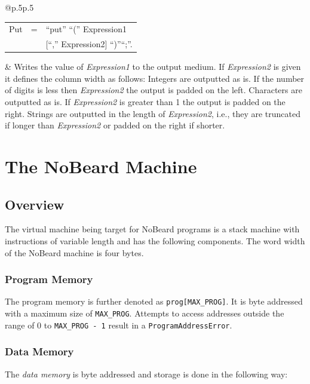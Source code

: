 \documentclass[11pt]{report}
\newcommand{\leongage}{NoBeard}
\newenvironment{grammar}[2]
	{
		\newcommand{\completerule}[2]{##1 & = & ##2.\\}
		\newcommand{\startrule}[2]{##1 & = & ##2\\}
		\newcommand{\alternativerule}[1]{ & $|$ & ##1\\}
		\newcommand{\alternativeend}[1]{ & $|$ & ##1.\\}
		\newcommand{\finishrule}[1]{ & & ##1.\\}
		\begin{tabular}{p{#1} c p{#2}}
	}
	{	\end{tabular}
	}
\begin{document}
\noindent \begin{tabular}{@{}p{}p{}}

\begin{grammar}{}{}
	\startrule{Put}{``put'' ``('' Expression1}
	\finishrule {[``,'' Expression2] ``)''``;''}
\end{grammar}
&
Writes the value of {\em Expression1} to the output medium. If {\em Expression2} is given it defines the column width as follows: Integers are outputted as is. If the number of digits is less then {\em Expression2} the output is padded on the left. Characters are outputted as is. If {\em Expression2} is greater than 1 the output is padded on the right. Strings are outputted in the length of {\em Expression2}, i.e., they are truncated if longer than {\em Expression2} or padded on the right if shorter.
\end{tabular}

\chapter{The \leongage{} Machine}
\lstset{language=AsmDef}
\section{Overview}
The virtual machine being target for \leongage{} programs is a stack machine with instructions of variable length and has the following components. The word width of the \leongage{} machine is four bytes.

\subsection{Program Memory}
The program memory is further denoted as \lstinline$prog[MAX_PROG]$. It is byte addressed with a maximum size of \lstinline$MAX_PROG$. Attempts to access addresses outside the range of 0 to \lstinline$MAX_PROG - 1$ result in a \lstinline$ProgramAddressError$.

\subsection{Data Memory}
The {\em data memory} is byte addressed and storage is done in the following way:
\end{document}
